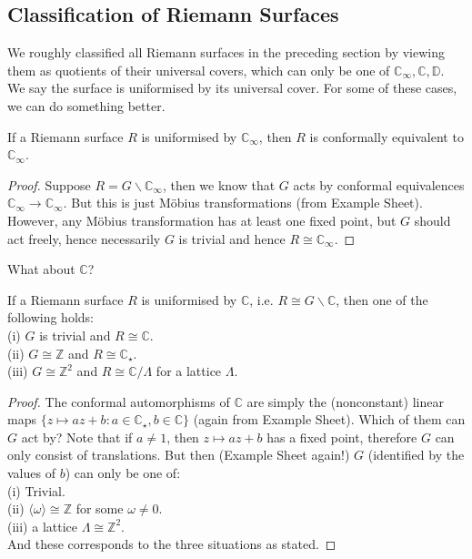 \subsection{Classification of Riemann Surfaces}
We roughly classified all Riemann surfaces in the preceding section by viewing them as quotients of their universal covers, which can only be one of $\mathbb C_\infty,\mathbb C,\mathbb D$.
We say the surface is uniformised by its universal cover.
For some of these cases, we can do something better.
\begin{proposition}
    If a Riemann surface $R$ is uniformised by $\mathbb C_\infty$, then $R$ is conformally equivalent to $\mathbb C_\infty$.
\end{proposition}
\begin{proof}
    Suppose $R=G\backslash\mathbb C_\infty$, then we know that $G$ acts by conformal equivalences $\mathbb C_\infty\to\mathbb C_\infty$.
    But this is just M\"obius transformations (from Example Sheet).
    However, any M\"obius transformation has at least one fixed point, but $G$ should act freely, hence necessarily $G$ is trivial and hence $R\cong\mathbb C_\infty$.
\end{proof}
What about $\mathbb C$?
\begin{proposition}
    If a Riemann surface $R$ is uniformised by $\mathbb C$, i.e. $R\cong G\backslash\mathbb C$, then one of the following holds:\\
    (i) $G$ is trivial and $R\cong\mathbb C$.\\
    (ii) $G\cong\mathbb Z$ and $R\cong\mathbb C_\star$.\\
    (iii) $G\cong\mathbb Z^2$ and $R\cong\mathbb C/\Lambda$ for a lattice $\Lambda$.
\end{proposition}
\begin{proof}
    The conformal automorphisms of $\mathbb C$ are simply the (nonconstant) linear maps $\{z\mapsto az+b:a\in\mathbb C_\star,b\in\mathbb C\}$ (again from Example Sheet).
    Which of them can $G$ act by?
    Note that if $a\neq 1$, then $z\mapsto az+b$ has a fixed point, therefore $G$ can only consist of translations.
    But then (Example Sheet again!) $G$ (identified by the values of $b$) can only be one of:\\
    (i) Trivial.\\
    (ii) $\langle\omega\rangle\cong\mathbb Z$ for some $\omega\neq 0$.\\
    (iii) a lattice $\Lambda\cong\mathbb Z^2$.\\
    And these corresponds to the three situations as stated.
\end{proof}
